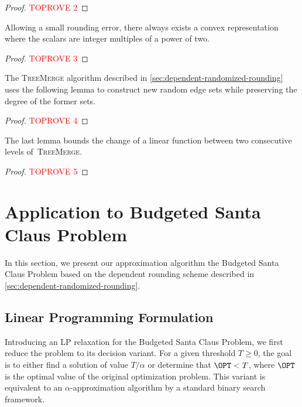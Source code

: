 \documentclass[a4paper,USenglish,cleveref,thm-restate]{lipics-v2021}
\begin{document}
\BoundedNumberOfFracVariables*

\begin{proof}\textcolor{red}{TOPROVE 2}\end{proof}

Allowing a small rounding error, there always exists a convex representation where the scalars are integer multiples of a power of two.

\ScalarRounding*

\begin{proof}\textcolor{red}{TOPROVE 3}\end{proof}

The \textsc{TreeMerge} algorithm described in \cref{sec:dependent-randomized-rounding} uses the following lemma to construct new random edge sets while preserving the degree of the former sets.

\EdgeSetDecomposition*

\begin{proof}\textcolor{red}{TOPROVE 4}\end{proof}

The last lemma bounds the change of a linear function between two consecutive levels of~\textsc{TreeMerge}.

\IncreaseOfLinearFunction*

\begin{proof}\textcolor{red}{TOPROVE 5}\end{proof} \section{Application to Budgeted Santa Claus Problem}
\label{sec:santa-claus}

In this section, we present our approximation algorithm the Budgeted Santa Claus Problem based on the dependent rounding scheme described in \cref{sec:dependent-randomized-rounding}.

\subsection{Linear Programming Formulation}
\label{subsec:lp}
Introducing an LP relaxation for the Budgeted Santa Claus Problem,  we first reduce the problem to its decision variant.
For a given threshold $T \ge 0$, the goal is to either
find a solution of value $T/ \alpha$ or determine that
$\OPT < T$, where $\OPT$ is the optimal value of the original optimization problem. This variant is equivalent to an
$\alpha$-approximation algorithm by a standard
binary search framework. 
\end{document}
